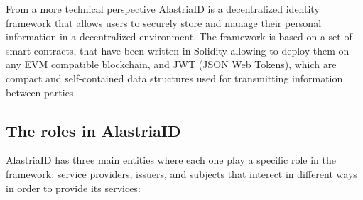 \documentclass[target=mst,aauheader=]{thud}
\begin{document}
From a more technical perspective AlastriaID is a decentralized identity framework that allows users to securely store and manage their personal information in a decentralized environment. The framework is based on a set of smart contracts, that have been written in Solidity allowing to deploy them on any EVM compatible blockchain, and JWT (JSON Web Tokens), which are compact and self-contained data structures used for transmitting information between parties. 

\subsection{The roles in AlastriaID}

AlastriaID has three main entities where each one play a specific role in the framework: service providers, issuers, and subjects that interect in different ways in order to provide its services:
\end{document}
